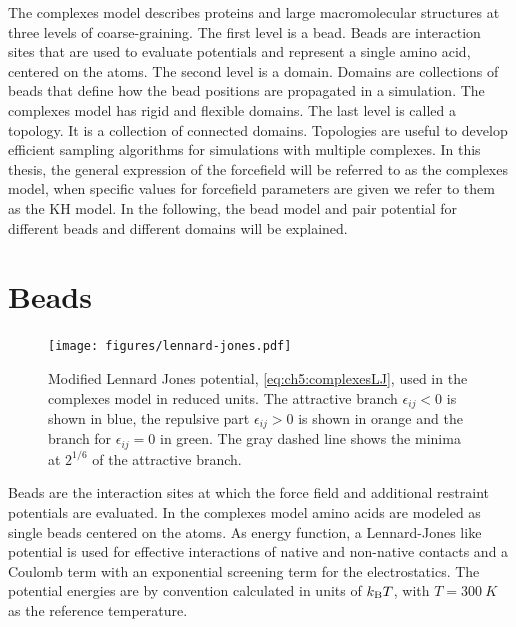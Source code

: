 \documentclass[12pt, twoside]{report}
\begin{document}
The complexes model describes proteins and large macromolecular structures at
three levels of coarse-graining. The first level is a bead. Beads are
interaction sites that are used to evaluate potentials and represent a single
amino acid, centered on the \calpha atoms. The second level is a domain. Domains
are collections of beads that define how the bead positions are propagated in a
simulation. The complexes model has rigid and flexible domains. The last level
is called a topology. It is a collection of connected domains. Topologies are
useful to develop efficient sampling algorithms for simulations with multiple
complexes. In this thesis, the general expression of the forcefield will be
referred to as the complexes model, when specific values for forcefield
parameters are given we refer to them as the \gls{KH} model. In the following,
the bead model and pair potential for different beads and different domains will
be explained.

\chapter{Beads}
\begin{figure}[!ht] \centering
\texttt{[image: figures/lennard-jones.pdf]}
\caption[Modified Lennard Jones potential used in \complexes.]{Modified Lennard
Jones potential, \cref{eq:ch5:complexesLJ}, used in the complexes model in
reduced units. The attractive branch \(\epsilon_{ij}<0\) is shown in blue, the
repulsive part \(\epsilon_{ij}>0\) is shown in orange and the branch for
\(\epsilon_{ij}=0\) in green. The gray dashed line shows the minima at
\(2^{1/6}\) of the attractive branch.}
\label{fig:lennard-jones}
\end{figure} Beads are the interaction sites at which the force field and
additional restraint potentials are evaluated. In the complexes model
\cite{Kim2008} amino acids are modeled as single beads centered on the \calpha
atoms. As energy function, a Lennard-Jones like potential is used for effective
interactions of native and non-native contacts and a Coulomb term with an
exponential screening term for the electrostatics. The potential energies are by
convention calculated in units of \(k_{\mathrm{B}}T\), with \(T=\SI{300}{K}\) as the
reference temperature.
\end{document}
